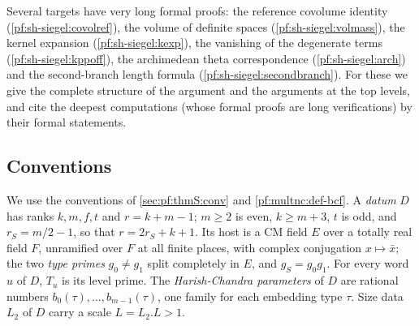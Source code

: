 Several targets have very long formal proofs: the reference covolume identity (\cref{pf:sh-siegel:covolref}), the volume of
definite spaces (\cref{pf:sh-siegel:volmass}), the kernel expansion (\cref{pf:sh-siegel:kexp}), the vanishing of the degenerate
terms (\cref{pf:sh-siegel:kppoff}), the archimedean theta correspondence (\cref{pf:sh-siegel:arch}) and the second-branch length
formula (\cref{pf:sh-siegel:secondbranch}). For these we give the complete structure of the argument and the arguments at the
top levels, and cite the deepest computations (whose formal proofs are long verifications) by their formal statements.

\subsection{Conventions}\label{sec:pf:sh-siegel:conv}

We use the conventions of \cref{sec:pf:thmS:conv} and \cref{pf:multnc:def-bcf}. A \emph{datum} $D$ has ranks
$k,m,f,t$ and $r=k+m-1$; $m\ge2$ is even, $k\ge m+3$, $t$ is odd, and $r_S=m/2-1$, so that $r=2r_S+k+1$. Its host is a
CM field $E$ over a totally real field $F$, unramified over $F$ at all finite places, with complex conjugation
$x\mapsto\bar x$; the two \emph{type primes} $g_0\ne g_1$ split completely in $E$, and $g_S=g_0g_1$. For every word $u$ of
$D$, $T_u$ is its level prime. The \emph{Harish-Chandra parameters} of $D$ are rational numbers $b_0(\tau),\dots,
b_{m-1}(\tau)$, one family for each embedding type $\tau$. Size data $L_2$ of $D$ carry a scale $L=L_2.L>1$.


